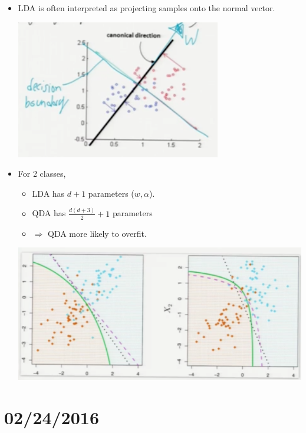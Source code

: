 \documentclass[10pt]{article}
\begin{document}
\begin{itemize}
\begin{itemize}
						\item LDA is often interpreted as projecting samples onto the normal vector.
							\begin{center}
								\includegraphics[scale=0.5]{images/lda_projections}
							\end{center}
						\item For 2 classes,
							\begin{itemize}
								\item LDA has $d + 1$ parameters ($w, \alpha$).
								\item QDA has $\frac{d(d+3)}{2} + 1$ parameters
								\item $\Rightarrow$ QDA more likely to overfit.
							\end{itemize}
							\begin{center}
								\includegraphics[scale=0.5]{images/overfitting}
							\end{center}
					\end{itemize}
			\end{itemize}


\newpage
\section*{02/24/2016}
\end{document}
